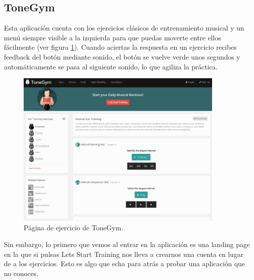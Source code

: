 \documentclass[12pt,twoside,titlepage]{report}
\begin{document}
\subsection{ToneGym}
\label{sec:ToneGym}

Esta aplicación cuenta con los ejercicios clásicos de entrenamiento musical y un menú siempre visible a la izquierda para que puedas moverte entre ellos fácilmente (ver figura \ref{fig:ToneGym}). Cuando aciertas la respuesta en un ejercicio recibes feedback del botón mediante sonido, el botón se vuelve verde unos segundos y automáticamente se pasa al siguiente sonido, lo que agiliza la práctica.
\cite{tonegym1}

\begin{figure}[H] 
    \includegraphics[width=0.9\textwidth]{Estado del Arte/tonegym}
    \centering
    \caption{Página de ejercicio de ToneGym.}
    \label{fig:ToneGym}
\end{figure}

Sin embargo, lo primero que vemos al entrar en la aplicación es una landing page en la que si pulsas Lets Start Training nos lleva a crearnos una cuenta en lugar de a los ejercicios. Esto es algo que echa para atrás a probar una aplicación que no conoces. 
\cite{tonegym2}
\end{document}
